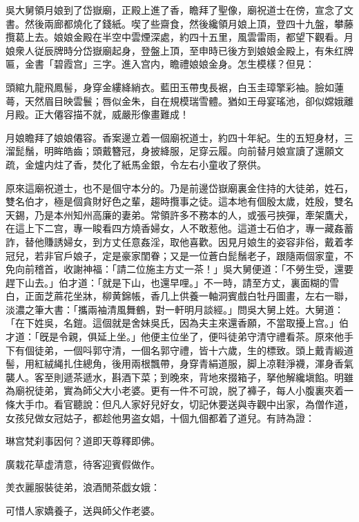 吳大舅領月娘到了岱嶽廟，正殿上進了香，瞻拜了聖像，廟祝道士在傍，宣念了文書。然後兩廊都燒化了錢紙。喫了些齋食，然後纔領月娘上頂，登四十九盤，攀藤攬葛上去。娘娘金殿在半空中雲煙深處，約四十五里，風雲雷雨，都望下觀看。月娘衆人従辰牌時分岱嶽廟起身，登盤上頂，至申時已後方到娘娘金殿上，有朱红牌匾，金書「碧霞宫」三字。進入宫内，瞻禮娘娘金身。怎生模樣？但見：

\begin{myquote}
頭綰九龍飛鳳髻，身穿金縷絳綃衣。藍田玉帶曳長裾，白玉圭璋擎彩袖。臉如蓮蕚，天然眉目映雲鬟；唇似金朱，自在規模瑞雪體。猶如王母宴瑤池，卻似嫦娥離月殿。正大僊容描不就，威嚴形像畫難成！
\end{myquote}

月娘瞻拜了娘娘僊容。香案邊立着一個廟祝道士，約四十年紀。生的五短身材，三溜髭鬚，明眸皓齒；頭戴簪冠，身披絳服，足穿云履。向前替月娘宣讀了還願文疏，金爐内炷了香，焚化了紙馬金銀，令左右小童收了祭供。

原來這廟祝道士，也不是個守本分的。乃是前邊岱嶽廟裏金住持的大徒弟，姓石，雙名伯才，極是個貪財好色之輩，趨時攬事之徒。這本地有個殷太歲，姓殷，雙名天錫，乃是本州知州高廉的妻弟。常領許多不務本的人，或張弓挾彈，牽架鷹犬，在這上下二宫，專一睃看四方燒香婦女，人不敢惹他。這道士石伯才，專一藏姦蓄詐，替他賺誘婦女，到方丈任意姦淫，取他喜歡。因見月娘生的姿容非俗，戴着孝冠兒，若非官戶娘子，定是豪家閨眷；又是一位蒼白髭鬚老子，跟隨兩個家童，不免向前稽首，收謝神福：「請二位施主方丈一茶！」吳大舅便道：「不勞生受，還要趕下山去。」伯才道：「就是下山，也還早哩。」不一時，請至方丈，裏面糊的雪白，正面芝蔴花坐牀，柳黄錦帳，香几上供養一軸洞賓戲白牡丹圖畫，左右一聯，淡濃之筆大書：「攜兩袖清風舞鶴，對一軒明月談經。」問吳大舅上姓。大舅道：「在下姓吳，名鎧。這個就是舍妹吳氏，因為夫主來還香願，不當取擾上宫。」伯才道：「旣是令親，俱延上坐。」他便主位坐了，便呌徒弟守清守禮看茶。原來他手下有個徒弟，一個呌郭守清，一個名郭守禮，皆十六歲，生的標致。頭上戴青緞道髻，用紅絨䋲扎住總角，後用兩根飄帶，身穿青絹道服，脚上凉鞋淨襪，渾身香氣襲人。客至則遞茶遞水，斟酒下菜；到晚來，背地來掇箱子，拏他解纔塡餡。明雖為廟祝徒弟，實為師父大小老婆。更有一件不可說，脱了褲子，每人小腹裏夾着一條大手巾。看官聽說：但凡人家好兒好女，切記休要送與寺觀中出家，為僧作道，女孩兒做女冠姑子，都趁他男盗女娼，十個九個都着了道兒。有詩為證：

\begin{myquote}
琳宫梵刹事因何？道即天尊釋即佛。

廣栽花草虚清意，待客迎賓假做作。

羙衣麗服裝徒弟，浪酒閒茶戯女娥：

可惜人家嬌養子，送與師父作老婆。
\end{myquote}

